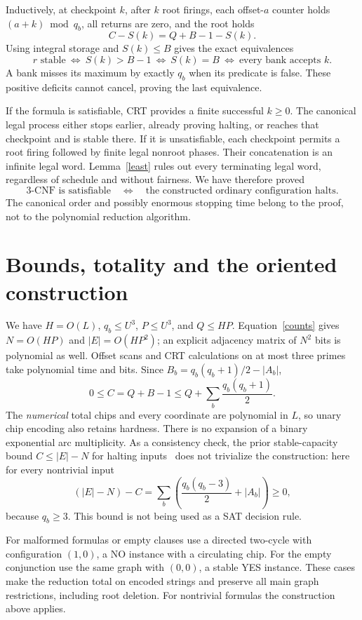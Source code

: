 \documentclass[11pt]{article}
\begin{document}
Inductively, at checkpoint $k$, after $k$ root firings, each offset-$a$ counter
holds $(a+k)\bmod q_b$, all returns are zero, and the root holds
\[
 C-S(k)=Q+B-1-S(k).
\]
Using integral storage and $S(k)\le B$ gives the exact equivalences
\begin{equation}\label{checkpoint}
 r\text{ stable}\ \Longleftrightarrow\ S(k)>B-1
 \ \Longleftrightarrow\ S(k)=B
 \ \Longleftrightarrow\ \text{every bank accepts }k.
\end{equation}
A bank misses its maximum by exactly $q_b$ when its predicate is false.
These positive deficits cannot cancel, proving the last equivalence.

If the formula is satisfiable, CRT provides a finite successful $k\ge0$.
The canonical legal process either stops earlier, already proving halting,
or reaches that checkpoint and is stable there. If it is unsatisfiable, each
checkpoint permits a root firing followed by finite legal nonroot phases.
Their concatenation is an infinite legal word. Lemma~\ref{least} rules out
every terminating legal word, regardless of schedule and without fairness.
We have therefore proved
\[
 \text{3-CNF is satisfiable}\quad\Longleftrightarrow\quad
 \text{the constructed ordinary configuration halts}.
\]
The canonical order and possibly enormous stopping time belong to the proof,
not to the polynomial reduction algorithm.

\section{Bounds, totality and the oriented construction}
We have $H=O(L)$, $q_b\le U^3$, $P\le U^3$, and $Q\le HP$.
Equation~\eqref{counts} gives $N=O(HP)$ and $|E|=O(HP^2)$; an explicit
adjacency matrix of $N^2$ bits is polynomial as well. Offset scans and CRT
calculations on at most three primes take polynomial time and bits.
Since $B_b= q_b(q_b+1)/2-|A_b|$,
\[
 0\le C=Q+B-1\le Q+\sum_b\frac{q_b(q_b+1)}2.
\]
The \emph{numerical} total chips and every coordinate are polynomial in $L$,
so unary chip encoding also retains hardness. There is no expansion of a
binary exponential arc multiplicity. As a consistency check, the prior
stable-capacity bound $C\le |E|-N$ for halting inputs~\cite[p.~2]{FL} does
not trivialize the construction: here for every nontrivial input
\[
 (|E|-N)-C=\sum_b\left(\frac{q_b(q_b-3)}2+|A_b|\right)\ge0,
\]
because $q_b\ge3$. This bound is not being used as a SAT decision rule.

For malformed formulas or empty clauses use a directed two-cycle with
configuration $(1,0)$, a NO instance with a circulating chip. For the empty
conjunction use the same graph with $(0,0)$, a stable YES instance. These
cases make the reduction total on encoded strings and preserve all main
graph restrictions, including root deletion. For nontrivial formulas the
construction above applies.
\end{document}
